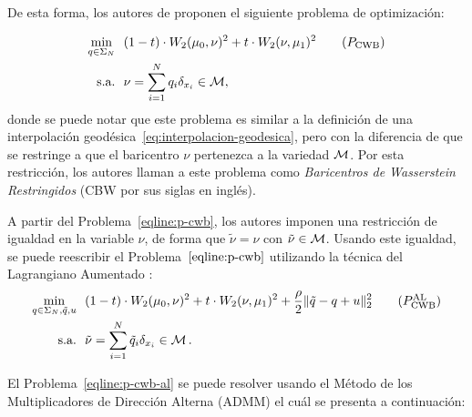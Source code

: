 De esta forma, los autores de \cite{simon2020barycenters} proponen el siguiente problema de optimización:

\begin{align}
    \min_{q \in \Simplex[N]} & \ \ (1-t) \cdot \Wasserstein[2]{\mu_0}{\nu}^2 + t \cdot \Wasserstein[2]{\nu}{\mu_1}^2
    \tag{$P_{\mathrm{CWB}}$}\label{eqline:p-cwb}                                                                     \\
    \text{s.a.}              & \ \ \nu = \sum_{i=1}^{N} q_i \delta_{x_i} \in \Manifold,
\end{align}
donde se puede notar que este problema es similar a la definición de una interpolación geodésica~\eqref{eq:interpolacion-geodesica}, pero con la diferencia de que se restringe a que el baricentro $\nu$ pertenezca a la variedad $\operatorname{\mathcal{M}}$. Por esta restricción, los autores llaman a este problema como \textit{Baricentros de Wasserstein Restringidos} (CBW por sus siglas en inglés).


A partir del Problema~\eqref{eqline:p-cwb}, los autores imponen una restricción de igualdad en la variable $\nu$, de forma que $\tilde \nu = \nu$ con $\tilde \nu \in \operatorname{\mathcal{M}}$. Usando este igualdad, se puede reescribir el Problema~$\eqref{eqline:p-cwb}$ utilizando la técnica del Lagrangiano Aumentado \cite[Sec. 2.3]{boyd2011distributed}:
\begin{align}
    \min_{q\in\Simplex[N],\tilde q,u} & \ \ (1-t) \cdot \Wasserstein[2]{\mu_0}{\nu}^2 + t \cdot \Wasserstein[2]{\nu}{\mu_1}^2
    + \frac{\rho}{2} \| \tilde q - q + u \|_2^2 \tag{$P_{\mathrm{CWB}}^{\mathrm{AL}}$}\label{eqline:p-cwb-al}
    \\
    \text{s.a.}                       & \ \ \tilde \nu = \sum_{i=1}^{N} \tilde q_i \delta_{x_i} \in \Manifold.
\end{align}


El Problema~\eqref{eqline:p-cwb-al} se puede resolver usando el Método de los Multiplicadores de Dirección Alterna (ADMM) \cite[Cap. 3]{boyd2011distributed} el cuál se presenta a continuación:

